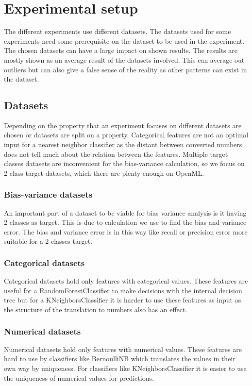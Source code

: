 \documentclass[a4paper,10pt]{article}
\begin{document}
\newpage
\section{Experimental setup} \label{Chapter3}
The different experiments use different datasets. The datasets used for some experiments need some prerequisite on the dataset to be used in the experiment. The chosen datasets can have a large impact on shown results.
The results are mostly shown as an average result of the datasets involved. This can average out outliers but can also give a false sense of the reality as other patterns can exist in the dataset.


\subsection{Datasets} \label{description}
Depending on the property that an experiment focuses on different datasets are chosen or datasets are split on a property. Categorical features are not an optimal input for a nearest neighbor classifier as the distant between converted numbers does not tell much about the relation between the features. Multiple target classes datasets are inconvenient for the bias-variance calculation, so we focus on 2 class target datasets, which there are plenty enough on OpenML. 

\subsubsection{Bias-variance datasets}
An important part of a dataset to be viable for bias variance analysis is it having 2 classes as target. This is due to calculation we use to find the bias and variance error. The bias and variance error is in this way like recall or precision error more suitable for a 2 classes target.  %
\subsubsection{Categorical datasets}
Categorical datasets hold only features with categorical values. These features are useful for a RandomForestClassifier to make decisions with the internal decision tree but for a KNeighborsClassifier it is harder to use these features as input as the structure of the translation to numbers also has an effect.
\subsubsection{Numerical datasets}
Numerical datasets hold only features with numerical values. These features are hard to use by classifiers like BernoulliNB which translates the values in their own way by uniqueness. For classifiers like KNeighborsClassifier it is easier to use the uniqueness of numerical values for predictions.
\end{document}
